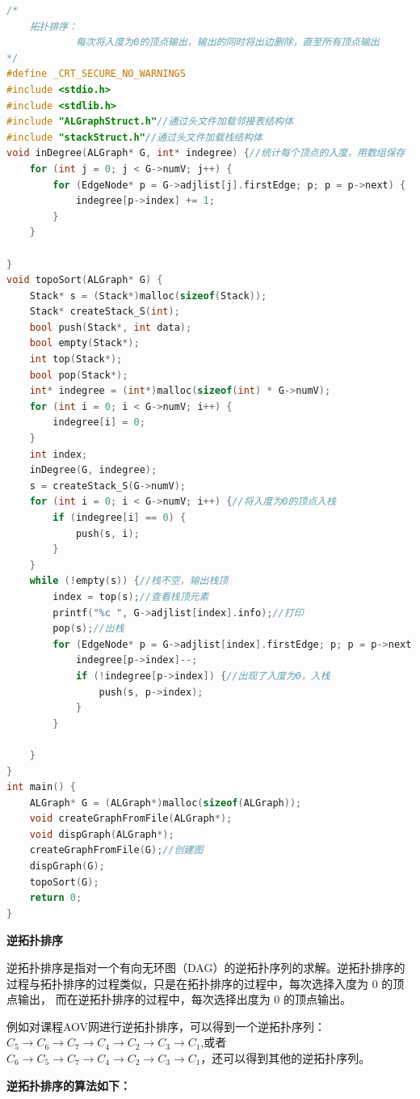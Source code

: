 \documentclass[lang=cn,newtx,10pt,scheme=chinese]{../elegantbook}
\begin{document}
\begin{lstlisting}[language=C++, caption={拓扑排序算法}]
  /*
	拓扑排序：
			每次将入度为0的顶点输出，输出的同时将出边删除，直至所有顶点输出
*/
#define _CRT_SECURE_NO_WARNINGS
#include <stdio.h>
#include <stdlib.h>
#include "ALGraphStruct.h"//通过头文件加载邻接表结构体
#include "stackStruct.h"//通过头文件加载栈结构体
void inDegree(ALGraph* G, int* indegree) {//统计每个顶点的入度，用数组保存
	for (int j = 0; j < G->numV; j++) {
		for (EdgeNode* p = G->adjlist[j].firstEdge; p; p = p->next) {
			indegree[p->index] += 1;
		}
	}

}
void topoSort(ALGraph* G) {
	Stack* s = (Stack*)malloc(sizeof(Stack));
	Stack* createStack_S(int);
	bool push(Stack*, int data);
	bool empty(Stack*);
	int top(Stack*);
	bool pop(Stack*);
	int* indegree = (int*)malloc(sizeof(int) * G->numV);
	for (int i = 0; i < G->numV; i++) {
		indegree[i] = 0;
	}
	int index;
	inDegree(G, indegree);
	s = createStack_S(G->numV);
	for (int i = 0; i < G->numV; i++) {//将入度为0的顶点入栈
		if (indegree[i] == 0) {
			push(s, i);
		}
	}
	while (!empty(s)) {//栈不空，输出栈顶
		index = top(s);//查看栈顶元素
		printf("%c ", G->adjlist[index].info);//打印
		pop(s);//出栈
		for (EdgeNode* p = G->adjlist[index].firstEdge; p; p = p->next) {//将当前出栈的顶点所指向的顶点的入度均-1
			indegree[p->index]--;
			if (!indegree[p->index]) {//出现了入度为0，入栈
				push(s, p->index);
			}
		}

	}
}
int main() {
	ALGraph* G = (ALGraph*)malloc(sizeof(ALGraph));
	void createGraphFromFile(ALGraph*);
	void dispGraph(ALGraph*);
	createGraphFromFile(G);//创建图
	dispGraph(G);
	topoSort(G);
	return 0;
}
\end{lstlisting}

\textbf{逆拓扑排序}

逆拓扑排序是指对一个有向无环图（DAG）的逆拓扑序列的求解。逆拓扑排序的过程与拓扑排序的过程类似，只是在拓扑排序的过程中，每次选择入度为 $0$ 的顶点输出，
而在逆拓扑排序的过程中，每次选择出度为 $0$ 的顶点输出。

例如对课程AOV网进行逆拓扑排序，可以得到一个逆拓扑序列：$C_5 \to C_6 \to C_7 \to C_4 \to C_2 \to C_3 \to C_1$,或者
 $C_6 \to C_5 \to C_7 \to C_4 \to C_2 \to C_3 \to C_1$，还可以得到其他的逆拓扑序列。

\textbf{逆拓扑排序的算法如下：}
\end{document}
